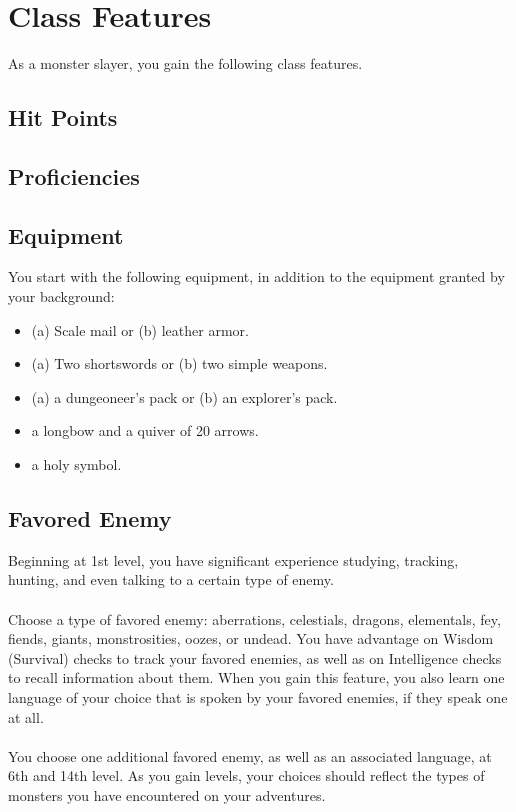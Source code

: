 \documentclass[11pt,a4paper,twocolumn]{article}
\begin{document}
	\section*{Class Features}
	As a monster slayer, you gain the following class features.
	
	\subsection*{Hit Points}
	
	\subsection*{Proficiencies}
	
	\subsection*{Equipment}
	You start with the following equipment, in
	addition to the equipment granted by your
	background:
	\begin{itemize}
		\item (a) Scale mail or (b) leather armor.
		\item (a) Two shortswords or (b) two simple weapons.
		\item (a) a dungeoneer's pack or (b) an explorer's pack.
		\item a longbow and a quiver of 20 arrows.
		\item a holy symbol.
	\end{itemize}
	\subsection*{Favored Enemy}
	Beginning at 1st level, you have significant experience studying, tracking, hunting, and even talking to a certain type of enemy. \\ \\
	Choose a type of favored enemy: aberrations, celestials, dragons, elementals, fey, fiends, giants, monstrosities, oozes, or undead.
	You have advantage on Wisdom (Survival) checks to track your favored enemies, as well as on Intelligence checks to recall information about them.
	When you gain this feature, you also learn one language of your choice that is spoken by your favored enemies, if they speak one at all. \\ \\
	You choose one additional favored enemy, as well as an associated language, at 6th and 14th level. As you gain levels, your choices should reflect the types of monsters you have encountered on your adventures.
	
\end{document}
